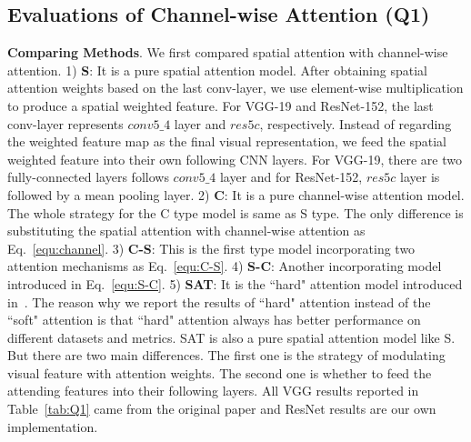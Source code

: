 \documentclass[10pt,twocolumn,letterpaper]{article}
\begin{document}
\subsection{Evaluations of Channel-wise Attention (Q1)}\label{sec:Q1}\textbf{Comparing Methods}. We first compared spatial attention with channel-wise attention. 1) \textbf{S}: It is a pure spatial attention model. After
obtaining spatial attention weights based on the last conv-layer, we use element-wise multiplication to produce a spatial weighted feature. For VGG-19 and
ResNet-152, the last conv-layer represents $conv5\_4$ layer and $res5c$, respectively. Instead of regarding the weighted feature map as the final visual
representation, we feed the spatial weighted feature into their own following CNN layers. For VGG-19, there are two fully-connected layers follows $conv5\_4$
layer and for ResNet-152, $res5c$ layer is followed by a mean pooling layer. 2) \textbf{C}: It is a pure channel-wise attention model. The whole strategy for
the C type model is same as S type. The only difference is substituting the spatial attention with channel-wise attention as Eq.~\eqref{equ:channel}. 3)
\textbf{C-S}: This is the first type model incorporating two attention mechanisms as Eq.~\eqref{equ:C-S}. 4) \textbf{S-C}: Another incorporating model
introduced in Eq.~\eqref{equ:S-C}. 5) \textbf{SAT}: It is the ``hard" attention model introduced in~\cite{xu2015show}. The reason why we report the results of
``hard" attention instead of the ``soft" attention is that ``hard" attention always has better performance on different datasets and metrics. SAT is also a
pure spatial attention model like S. But there are two main differences. The first one is the strategy of modulating visual feature with attention weights.
The second one is whether to feed the attending features into their following layers. All VGG results reported in Table~\ref{tab:Q1} came from the original
paper and ResNet results are our own implementation.
\end{document}
